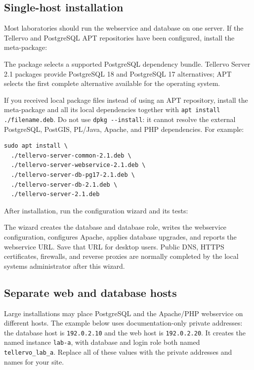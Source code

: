 \subsection{Single-host installation}

Most laboratories should run the webservice and database on one server. If the
Tellervo and PostgreSQL APT repositories have been configured, install the
meta-package:


The package selects a supported PostgreSQL dependency bundle. Tellervo Server 2.1
packages provide PostgreSQL 18 and PostgreSQL 17 alternatives; APT selects the
first complete alternative available for the operating system.

If you received local package files instead of using an APT repository, install
the meta-package and all its local dependencies together with
\verb|apt install ./filename.deb|. Do not use \verb|dpkg --install|: it cannot
resolve the external PostgreSQL, PostGIS, PL/Java, Apache, and PHP dependencies.
For example:

\begin{lstlisting}
sudo apt install \
  ./tellervo-server-common-2.1.deb \
  ./tellervo-server-webservice-2.1.deb \
  ./tellervo-server-db-pg17-2.1.deb \
  ./tellervo-server-db-2.1.deb \
  ./tellervo-server-2.1.deb
\end{lstlisting}

After installation, run the configuration wizard and its tests:


The wizard creates the database and database role, writes the webservice
configuration, configures Apache, applies database upgrades, and reports the
webservice URL. Save that URL for desktop users. Public DNS, HTTPS certificates,
firewalls, and reverse proxies are normally completed by the local systems
administrator after this wizard.

\subsection{Separate web and database hosts}
\label{txt:splitinstall}

Large installations may place PostgreSQL and the Apache/PHP webservice on
different hosts. The example below uses documentation-only private addresses:
the database host is \verb|192.0.2.10| and the web host is
\verb|192.0.2.20|. It creates the named instance \verb|lab-a|, with database
and login role both named \verb|tellervo_lab_a|. Replace all of these values
with the private addresses and names for your site.

